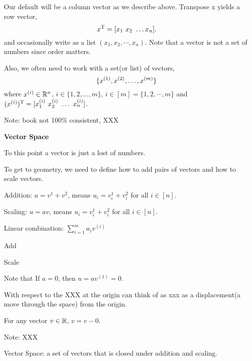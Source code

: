 Our default will be a column vector as we describe above. Transpose x yields a row vector,   
\begin{equation*}
x^{\rm T} = [ x_1 \ x_2 \ \ldots x_n].
\end{equation*}
and occasionally write as a list $(x_{1}, x_{2},\cdots,x_{n})$.  Note that a vector is not a set of numbers since order matters.

Also, we often need to work with a set(or list) of vectors,
\begin{equation*}
\{ x^{(1)}_{}, x^{(2)}_{}, \ldots, x^{(m)}_{}\}
\end{equation*}
where $x^{(i)}_{} \in \mathbb{R}^n$, $i \in \{1, 2, \ldots, m\}$, $i \in [m] = \{1,2,\cdots,m\}$ and
$(\vecx{i})^\trans = [ \vecx[1]{i} \ \vecx[2]{i} \ \ldots \ \vecx[n]{i} ]$.  

Note: book not 100\% consistent, XXX

\vspace{0.5cm}
\noindent\textbf{Vector Space}

To this point a vector is just a lost of numbers.

To get to geometry, we need to define how to add pairs of vectors and how to scale vectors.

Addition: $u=v^{1}+v^{2}$, means $u_{i}=v_{i}^{1}+v_{i}^{2}$ for all $i\in [n]$.

Scaling: $u=av$,  means $u_{i}=v_{i}^{1}+v_{i}^{2}$ for all $i\in [n]$.

Linear combination: $\sum_{i=1}^{m} a_{i}v^{(i)}$

\begin{marginfigure}
	\centering
	\resizebox{7.5cm}{3cm}{}
	\caption{Add}
	\label{fig.2-1}
\end{marginfigure}
\begin{marginfigure}
	\centering
	\resizebox{7.5cm}{3cm}{}
	\caption{Scale}
	\label{fig.2-2}
\end{marginfigure}

Note that If $a=0$, then $u=av^{(1)}=0$.

\vspace{0.5cm}

With respect to the XXX at the origin can think of as xxx as a displacement(a move through the space) from the origin.

For any vector $v\in\mathbb{R}$, $v=v-0$.

Note: XXX


Vector Space: a set of vectors that is closed under addition and scaling.

